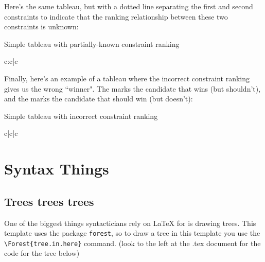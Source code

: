 \documentclass{article}
\begin{document}

Here's the same tableau, but with a dotted line separating the first and second constraints to indicate that the ranking relationship between these two constraints is unknown:

\ea Simple tableau with partially-known constraint ranking

\begin{tableau}{c:c|c}
 \vio{*!} \vio{} \vio{} 
 \vio{} \vio{} \vio{*} 
 \vio{} \vio{*!} \vio{}
\end{tableau}
\z


Finally, here's an example of a tableau where the incorrect constraint ranking gives us the wrong ``winner". The \bomb{} marks the candidate that wins (but shouldn't), and the \grimace{} marks the candidate that should win (but doesn't):

\ea Simple tableau with incorrect constraint ranking

\ShadingOn
\begin{tableau}{c|c|c}
 \vio{*!} \vio{} \vio{} 
 \vio{} \vio{*!} \vio{} 
 \vio{} \vio{} \vio{*}
\end{tableau}
\z

\section{Syntax Things} \label{SectSyntax}


\subsection{Trees trees trees}

One of the biggest things syntacticians rely on \LaTeX{} for is drawing trees. This template uses the package \texttt{forest}, so to draw a tree in this template you use the \verb|\Forest{tree.in.here}| command. (look to the left at the .tex document for the code for the tree below)
\end{document}
